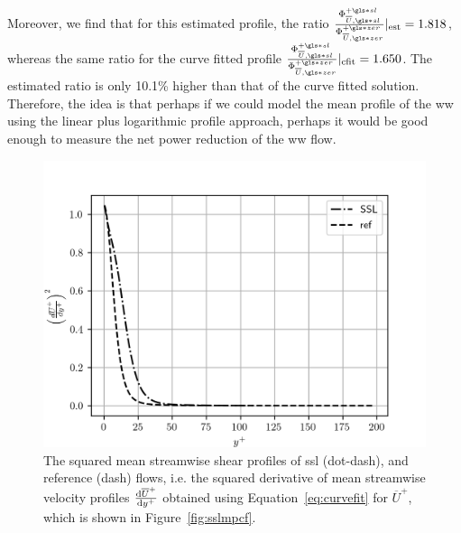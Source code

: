 Moreover, we find that for this estimated profile, the ratio $\frac{\Phi _{\overline{U},\gls*{sl}}\ps}{\Phi _{\overline{U},\gls*{zer}}\pz}\rvert_\text{est}=1.818$, whereas the same ratio for the curve fitted profile $\frac{\Phi _{\overline{U},\gls*{sl}}\ps}{\Phi _{\overline{U},\gls*{zer}}\pz}\rvert_\text{cfit}=1.650$. The estimated ratio is only 10.1\% higher than that of the curve fitted solution. Therefore, the idea is that perhaps if we could model the mean profile of the \gls*{ww} using the linear plus logarithmic profile approach, perhaps it would be good enough to measure the net power reduction of the \gls*{ww} flow.
\begin{figure}[htbp]
	\centering
	\includegraphics[width=0.7\linewidth]{project/fig/sslmeandiff.png}
	\caption[Mean streamwise shear profile squared of SSL and reference flows]{The squared mean streamwise shear profiles of \gls*{ssl} (dot-dash), and reference (dash) flows, i.e. the squared derivative of mean streamwise velocity profiles $\dv{\overline{U}^{+}}{y^{+}} $ obtained using Equation~\eqref{eq:curvefit} for $\overline{U}^{+}$, which is shown in Figure~\ref{fig:sslmpcf}.}
	\label{fig:sslmpdiff}
\end{figure}


